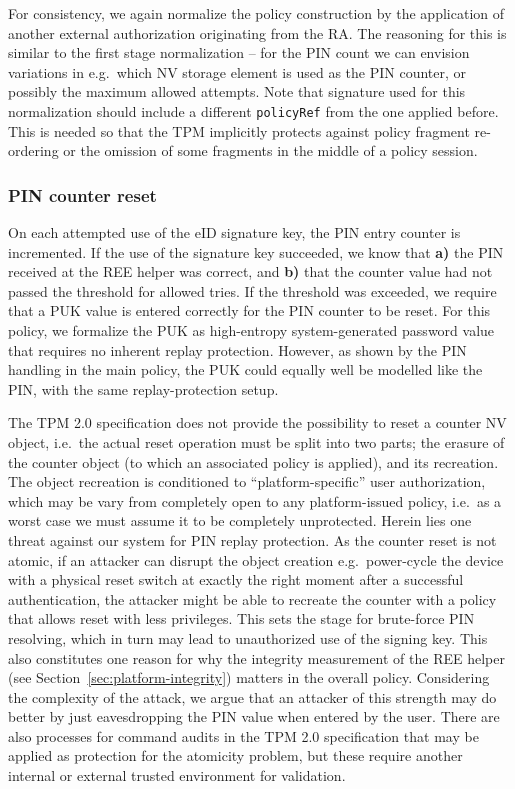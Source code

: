 \documentclass{sig-alternate-2013}
\begin{document}
For consistency, we again normalize the policy construction by the application
of another external authorization originating from the RA\@. The reasoning for
this is similar to the first stage normalization -- for the PIN count we can
envision variations in e.g.\ which NV storage element is used as the PIN
counter, or possibly the maximum allowed attempts. Note that signature used for
this normalization should include a different \texttt{policyRef} from the one
applied before. This is needed so that the TPM implicitly protects against
policy fragment re-ordering or the omission of some fragments in the middle of a
policy session.

\subsubsection{PIN counter reset}
\label{sec:pin-counter-reset}

On each attempted use of the eID signature key, the PIN entry counter is
incremented. If the use of the signature key succeeded, we know that \textbf{a)}
the PIN received at the REE helper was correct, and \textbf{b)} that the counter
value had not passed the threshold for allowed tries. If the threshold was
exceeded, we require that a PUK value is entered correctly for the PIN counter
to be reset. For this policy, we formalize the PUK as high-entropy
system-generated password value that requires no inherent replay protection.
However, as shown by the PIN handling in the main policy, the PUK could equally
well be modelled like the PIN, with the same replay-protection setup.

The TPM 2.0 specification does not provide the possibility to reset a counter NV
object, i.e.\ the actual reset operation must be split into two parts; the
erasure of the counter object (to which an associated policy is applied), and
its recreation. The object recreation is conditioned to ``platform-specific''
user authorization, which may be vary from completely open to any
platform-issued policy, i.e.\ as a worst case we must assume it to be completely
unprotected. Herein lies one threat against our system for PIN replay
protection. As the counter reset is not atomic, if an attacker can disrupt the
object creation e.g.\ power-cycle the device with a physical reset switch at
exactly the right moment after a successful authentication, the attacker might
be able to recreate the counter with a policy that allows reset with less
privileges. This sets the stage for brute-force PIN resolving, which in turn
may lead to unauthorized use of the signing key. This also constitutes one
reason for why the integrity measurement of the REE helper (see
Section~\ref{sec:platform-integrity}) matters in the overall policy. Considering
the complexity of the attack, we argue that an attacker of this strength may do
better by just eavesdropping the PIN value when entered by the user. There are
also processes for command audits in the TPM 2.0 specification that may be
applied as protection for the atomicity problem, but these require another
internal or external trusted environment for validation.
\end{document}

